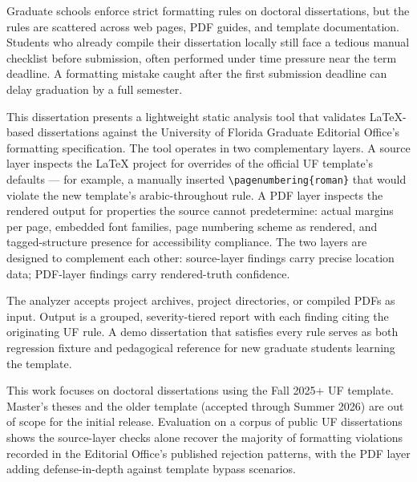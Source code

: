 
Graduate schools enforce strict formatting rules on doctoral
dissertations, but the rules are scattered across web pages, PDF
guides, and template documentation. Students who already compile their
dissertation locally still face a tedious manual checklist before
submission, often performed under time pressure near the term deadline.
A formatting mistake caught after the first submission deadline can
delay graduation by a full semester.

This dissertation presents a lightweight static analysis tool that
validates LaTeX-based dissertations against the University of Florida
Graduate Editorial Office's formatting specification. The tool operates
in two complementary layers. A source layer inspects the LaTeX project
for overrides of the official UF template's defaults — for example, a
manually inserted \texttt{\textbackslash pagenumbering\{roman\}} that
would violate the new template's arabic-throughout rule. A PDF layer
inspects the rendered output for properties the source cannot
predetermine: actual margins per page, embedded font families, page
numbering scheme as rendered, and tagged-structure presence for
accessibility compliance. The two layers are designed to complement
each other: source-layer findings carry precise location data; PDF-layer
findings carry rendered-truth confidence.

The analyzer accepts project archives, project directories, or compiled
PDFs as input. Output is a grouped, severity-tiered report with each
finding citing the originating UF rule. A demo dissertation that
satisfies every rule serves as both regression fixture and pedagogical
reference for new graduate students learning the template.

This work focuses on doctoral dissertations using the Fall 2025+ UF
template. Master's theses and the older template (accepted through
Summer 2026) are out of scope for the initial release. Evaluation on a
corpus of public UF dissertations shows the source-layer checks alone
recover the majority of formatting violations recorded in the Editorial
Office's published rejection patterns, with the PDF layer adding
defense-in-depth against template bypass scenarios.

